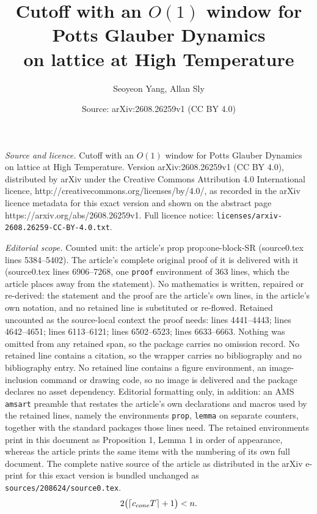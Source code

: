 \documentclass[10pt,a4paper]{amsart}
\title{Cutoff with an $O(1)$ window for Potts Glauber Dynamics\\on lattice at High Temperature}
\author{Seoyeon Yang, Allan Sly}
\date{Source: arXiv:2608.26259v1 (CC BY 4.0)}
\begin{document}
\maketitle

\noindent\emph{Source and licence.} Cutoff with an $O(1)$ window for Potts Glauber Dynamics\\on lattice at High Temperature. Version arXiv:2608.26259v1 (CC BY 4.0), distributed by arXiv under the Creative Commons Attribution 4.0 International licence, http://creativecommons.org/licenses/by/4.0/, as recorded in the arXiv licence metadata for this exact version and shown on the abstract page https://arxiv.org/abs/2608.26259v1. Full licence notice: \texttt{licenses/arxiv-2608.26259-CC-BY-4.0.txt}.\par\smallskip

\noindent\textit{Editorial scope.} Counted unit: the article's prop prop:one-block-SR (source0.tex lines 5384--5402). The article's complete original proof of it is delivered with it (source0.tex lines 6906--7268, one \texttt{proof} environment of 363 lines, which the article places away from the statement). No mathematics is written, repaired or re-derived: the statement and the proof are the article's own lines, in the article's own notation, and no retained line is substituted or re-flowed.  Retained uncounted as the source-local context the proof needs: lines 4441--4443; lines 4642--4651; lines 6113--6121; lines 6502--6523; lines 6633--6663.  Nothing was omitted from any retained span, so the package carries no omission record.  No retained line contains a citation, so the wrapper carries no bibliography and no bibliography entry.  No retained line contains a figure environment, an image-inclusion command or drawing code, so no image is delivered and the package declares no asset dependency.  Editorial formatting only, in addition: an AMS \texttt{amsart} preamble that restates the article's own declarations and macros used by the retained lines, namely the environments \texttt{prop}, \texttt{lemma} on separate counters, together with the standard packages those lines need.  The retained environments print in this document as Proposition 1, Lemma 1 in order of appearance, whereas the article prints the same items with the numbering of its own full document.  The complete native source of the article as distributed in the arXiv e-print for this exact version is bundled unchanged as \texttt{sources/208624/source0.tex}.
\begin{equation}\label{eq:cone-embedded}
2\bigl(\lceil c_{\rm cone}T\rceil+1\bigr)<n.
\end{equation}
\end{document}
